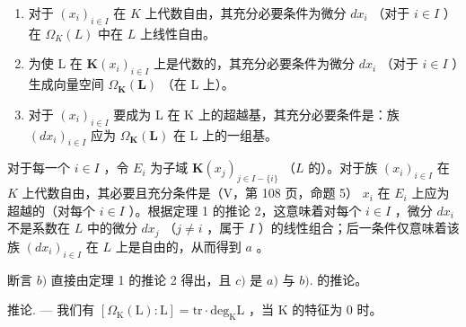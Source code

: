 \begin{enumerate}
\def\labelenumi{\alph{enumi})}
\item
  对于 \((x_{i})_{i\in I}\) 在 \(K\) 上代数自由，其充分必要条件为微分 \(dx_{i}\) （对于 \(i\in I\) ）在 \(\Omega_K(L)\) 中在 \(L\) 上线性自由。
\item
  为使 L 在 \(\mathbf{K}(x_{i})_{i\in I}\) 上是代数的，其充分必要条件为微分 \(dx_{i}\) （对于 \(i\in I\) ）生成向量空间 \(\Omega_{\mathbf{K}}(\mathbf{L})\) （在 L 上）。
\item
  对于 \((x_{i})_{i\in I}\) 要成为 L 在 K 上的超越基，其充分必要条件是：族 \((dx_{i})_{i\in I}\) 应为 \(\Omega_{\mathbf{K}}(\mathbf{L})\) 在 L 上的一组基。
\end{enumerate}

对于每一个 \(i \in I\) ，令 \(E_i\) 为子域 \(\mathbf{K}(x_j)_{j \in I - \{i\}}\) （\(L\) 的）。对于族 \((x_i)_{i \in I}\) 在 \(K\) 上代数自由，其必要且充分条件是（V，第 108 页，命题 5） \(x_i\) 在 \(E_i\) 上应为超越的（对每个 \(i \in I\) ）。根据定理 1 的推论 2，这意味着对每个 \(i \in I\) ，微分 \(dx_i\) 不是系数在 \(L\) 中的微分 \(dx_j\) （\(j \neq i\) ，属于 \(I\) ）的线性组合；后一条件仅意味着该族 \((dx_i)_{i \in I}\) 在 \(L\) 上是自由的，从而得到 \(a\) 。

断言 \(b)\) 直接由定理 1 的推论 2 得出，且 \(c)\) 是 \(a)\) 与 \(b).\) 的推论。

推论. --- 我们有 \([\Omega_{\mathrm{K}}(\mathrm{L}):\mathrm{L}]=\mathrm{tr}\cdot\mathrm{deg}_{\mathrm{K}}\mathrm{L}\) ，当 K 的特征为 0 时。

